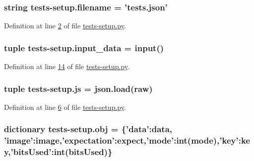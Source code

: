 \hypertarget{namespacetests-setup_a1c1b6d4c14026d664106586c65e10a94}{
\subsubsection[{filename}]{\setlength{\rightskip}{0pt plus 5cm}string tests-\/setup.\-filename = 'tests.\-json'}}\label{namespacetests-setup_a1c1b6d4c14026d664106586c65e10a94}


Definition at line \hyperlink{tests-setup_8py_source_l00002}{2} of file \hyperlink{tests-setup_8py_source}{tests-\/setup.\-py}.

\hypertarget{namespacetests-setup_afd542601d7bb174d46d247a6b8f52580}{
\subsubsection[{input\-\_\-data}]{\setlength{\rightskip}{0pt plus 5cm}tuple tests-\/setup.\-input\-\_\-data = input()}}\label{namespacetests-setup_afd542601d7bb174d46d247a6b8f52580}


Definition at line \hyperlink{tests-setup_8py_source_l00014}{14} of file \hyperlink{tests-setup_8py_source}{tests-\/setup.\-py}.

\hypertarget{namespacetests-setup_a08da0efe29fc9ddaa5f121eda9688b6d}{
\subsubsection[{js}]{\setlength{\rightskip}{0pt plus 5cm}tuple tests-\/setup.\-js = json.\-load({\bf raw})}}\label{namespacetests-setup_a08da0efe29fc9ddaa5f121eda9688b6d}


Definition at line \hyperlink{tests-setup_8py_source_l00006}{6} of file \hyperlink{tests-setup_8py_source}{tests-\/setup.\-py}.

\hypertarget{namespacetests-setup_afb80c1236926b5468a6d3e942a527a96}{
\subsubsection[{obj}]{\setlength{\rightskip}{0pt plus 5cm}dictionary tests-\/setup.\-obj = \{'data'\-:data, 'image'\-:image,'expectation'\-:expect,'mode'\-:int(mode),'key'\-:key,'bits\-Used'\-:int(bits\-Used)\}}}\label{namespacetests-setup_afb80c1236926b5468a6d3e942a527a96}


